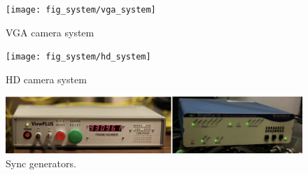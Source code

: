 \begin{figure}
	\centering       
	\texttt{[image: fig\_system/vga\_system]}	
	\caption{VGA camera system} 
\end{figure}


\begin{figure}
	\centering       
	\texttt{[image: fig\_system/hd\_system]}	
	\caption{HD camera system} 
\end{figure}


\begin{figure}
	\centering       
	\includegraphics[trim=0 0 0 0,clip,width=\linewidth]{fig_system/dome_syncgens.png}
	\caption{Sync generators.} 
\end{figure}



